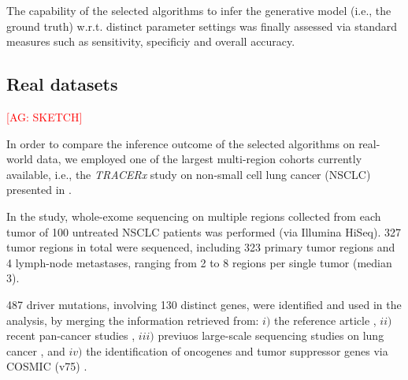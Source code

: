 \documentclass{article}
\begin{document}
The capability of the selected algorithms to infer the generative model (i.e., the ground truth) w.r.t. distinct parameter settings was finally assessed via standard measures such as sensitivity, specificiy and overall accuracy. 




\subsection{Real datasets}
\textcolor{red}{[AG: SKETCH]}

In order to compare the inference outcome of the selected algorithms on real-world data, we employed one of the largest multi-region cohorts currently available, i.e., the \emph{TRACERx} study on non-small cell lung cancer (NSCLC) presented in \cite{jamal2017tracking}. 

In the study, whole-exome sequencing on multiple regions collected from each tumor of 100 untreated NSCLC patients was performed (via Illumina HiSeq). 
327 tumor regions in total were sequenced, including 323 primary tumor regions and 4 lymph-node metastases, ranging from 2 to 8 regions per single tumor (median 3).

487  driver mutations, involving 130 distinct genes, were identified and used in the analysis, by merging the information retrieved from: $i)$ the reference article \cite{jamal2017tracking}, $ii)$ recent pan-cancer studies \cite{lawrence2014discovery}, $iii)$ previuos large-scale sequencing studies on lung cancer \cite{cancer2012comprehensive,cancer2014comprehensive}, and $iv)$ the identification of oncogenes and tumor suppressor genes  via COSMIC (v75) \cite{forbes2016cosmic}.
\end{document}
